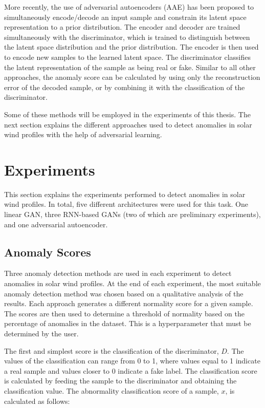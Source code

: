 More recently, the use of adversarial autoencoders (AAE) has been proposed \cite{zenati.etal_AdversariallyLearnedAnomaly_2018,wang.etal_AdVAESelfadversarialVariational_2020} to simultaneously encode/decode an input sample and constrain its latent space representation to a prior distribution. The encoder and decoder are trained simultaneously with the discriminator, which is trained to distinguish between the latent space distribution and the prior distribution. The encoder is then used to encode new samples to the learned latent space. The discriminator classifies the latent representation of the sample as being real or fake. Similar to all other approaches, the anomaly score can be calculated by using only the reconstruction error of the decoded sample, or by combining it with the classification of the discriminator.

Some of these methods will be employed in the experiments of this thesis. The next section explains the different approaches used to detect anomalies in solar wind profiles with the help of adversarial learning.

\section{Experiments}\label{sec:gan_experiments}
This section explains the experiments performed to detect anomalies in solar wind profiles. In total, five different architectures were used for this task. One linear GAN, three RNN-based GANs (two of which are preliminary experiments), and one adversarial autoencoder.

\subsection{Anomaly Scores}\label{sec:gan_anomaly_scores}
Three anomaly detection methods are used in each experiment to detect anomalies in solar wind profiles. At the end of each experiment, the most suitable anomaly detection method was chosen based on a qualitative analysis of the results. Each approach generates a different normality score for a given sample. The scores are then used to determine a threshold of normality based on the percentage of anomalies in the dataset. This is a hyperparameter that must be determined by the user.

The first and simplest score is the classification of the discriminator, $D$. The values of the classification can range from 0 to 1, where values equal to 1 indicate a real sample and values closer to 0 indicate a fake label. The classification score is calculated by feeding the sample to the discriminator and obtaining the classification value. The abnormality classification score of a sample, $x$, is calculated as follows:

